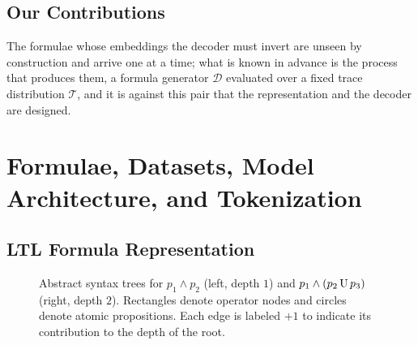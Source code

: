 \documentclass[titlepage,a4paper,11pt]{report}
\begin{document}
    \section{Our Contributions}
    The formulae whose embeddings the decoder must invert are unseen by construction and arrive one at a time; what is known in advance is the process that produces them, a formula generator $\mathcal D$ evaluated over a fixed trace distribution $\mathcal T$, and it is against this pair that the representation and the decoder are designed.

\chapter{Formulae, Datasets, Model Architecture, and Tokenization}

    \section{LTL Formula Representation}\label{sec:formula_representation}
    \begin{figure}
        \centering
        \caption{Abstract syntax trees for $p_1 \land p_2$ (left, depth $1$) and $p_1 \land (p_2 \, \text{U} \, p_3)$ (right, depth $2$). Rectangles denote operator nodes and circles denote atomic propositions. Each edge is labeled $+1$ to indicate its contribution to the depth of the root.}
        \vspace{8pt}
        \hspace{25pt}
        \label{fig:formula_ast}
    \end{figure}
\end{document}
